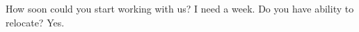 
\begin{entrylist}
    \entry
    {}
    {How soon could you start working with us?}
    {}
    {
        I need a week.
    }
    \entry
    {}
    {Do you have ability to relocate?}
    {}
    {
        Yes.
    }
\end{entrylist}
